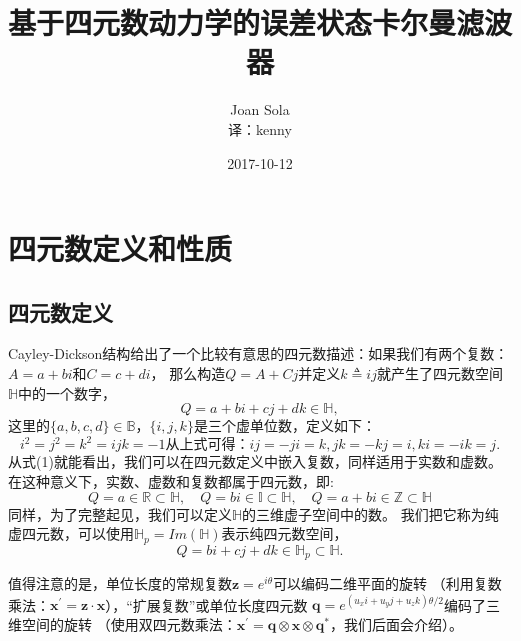 \documentclass[10pt, a4paper]{article}
\begin{document}
  \title{基于四元数动力学的误差状态卡尔曼滤波器}
  \author{Joan Sola \\ \small{译：kenny}}
  \date{2017-10-12}
  \maketitle
  \thispagestyle{empty}
  \newpage

  \setcounter{tocdepth}{3}
  \tableofcontents
  \listoffigures
  \listoftables
  \thispagestyle{empty}
  \newpage

  \section{四元数定义和性质}

  \subsection{四元数定义}
  \setlength{\parindent}{2 em}
  Cayley-Dickson结构给出了一个比较有意思的四元数描述：如果我们有两个复数：$A = a + bi$和$C = c + di$，
  那么构造$Q = A + Cj$并定义$k \triangleq ij$就产生了四元数空间$\mathbb{H}$中的一个数字，
  \begin{equation} \label{eq-1}
    Q = a + bi + cj + dk \in \mathbb{H},
  \end{equation}
  这里的$\{a,b,c,d\} \in \mathbb{B}$，$\{i, j, k\}$是三个虚单位数，定义如下：
  \begin{subequations} \label{eq-2}
    \begin{equation}
      i^2 = j^2 = k^2 = ijk = -1
    \end{equation}
  从上式可得：
  \begin{equation}
    ij = -ji = k, jk = -kj = i, ki = -ik = j.
  \end{equation}
  \end{subequations}
  从式(1)就能看出，我们可以在四元数定义中嵌入复数，同样适用于实数和虚数。
  在这种意义下，实数、虚数和复数都属于四元数，即:
  \begin{equation} \label{eq-3}
    Q = a \in \mathbb{R} \subset \mathbb{H}, \quad
    Q = bi \in \mathbb{I} \subset \mathbb{H}, \quad
    Q = a + bi \in \mathbb{Z} \subset \mathbb{H}
  \end{equation}
  同样，为了完整起见，我们可以定义$\mathbb{H}$的三维虚子空间中的数。
  我们把它称为纯虚四元数，可以使用$\mathbb{H}_{p}=Im(\mathbb{H})$表示纯四元数空间，
  \begin{equation} \label{eq-4}
    Q = bi + cj + dk \in \mathbb{H}_{p} \subset \mathbb{H}.
  \end{equation}
  \par
  值得注意的是，单位长度的常规复数$\mathbf{z}=e^{i\theta}$可以编码二维平面的旋转
  （利用复数乘法：$\mathbf{x}^{'}=\mathbf{z} \cdot \mathbf{x}$），“扩展复数”或单位长度四元数
  $\mathbf{q} = e^{(u_xi + u_yj + u_zk)\theta/2}$编码了三维空间的旋转
  （使用双四元数乘法：$\mathbf{x}^{'}=\mathbf{q} \otimes \mathbf{x} \otimes \mathbf{q}^{*}$，我们后面会介绍）。
\end{document}
